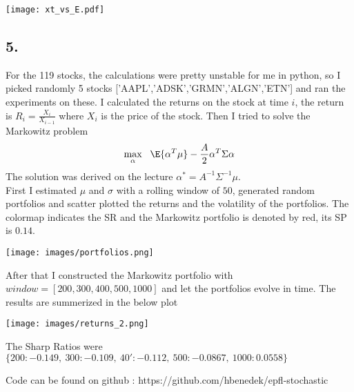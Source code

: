 \begin{center}
    \texttt{[image: xt\_vs\_E.pdf]}
\end{center}
\subsection*{5.}
For the 119 stocks, the calculations were pretty unstable for me in python, so I picked randomly 5 stocks ['AAPL','ADSK','GRMN','ALGN','ETN'] and ran the experiments on these. I calculated the returns on the stock at time $i$, the return is $R_i=\frac{X_i}{X_{i-1}}$ where $X_i$ is the price of the stock. Then I tried to solve the Markowitz problem
\begin{gather*}
    \max_{\alpha} ~~\E{\alpha^T \mu} - \frac{A}{2}\alpha^T\Sigma \alpha
\end{gather*}
The solution was derived on the lecture $\alpha^*= A^{-1}\Sigma^{-1}\mu$. \\
First I estimated $\mu$ and $\sigma$ with a rolling window of $50$, generated random portfolios and scatter plotted the returns and the volatility of the portfolios. The colormap indicates the SR and the Markowitz portfolio is denoted by red, its SP is $0.14$.

\begin{center}
    \texttt{[image: images/portfolios.png]}
\end{center}

After that I constructed the Markowitz portfolio with $window=[200, 300, 400, 500, 1000]$ and let the portfolios evolve in time. The results are summerized in the below plot

\begin{center}
    \texttt{[image: images/returns\_2.png]}
\end{center}

The Sharp Ratios were 
$\{200: -0.149,~
 300: -0.109,~
 40': -0.112,~
 500: -0.0867,~
 1000: 0.0558\}$
 
 Code can be found on github : https://github.com/hbenedek/epfl-stochastic


